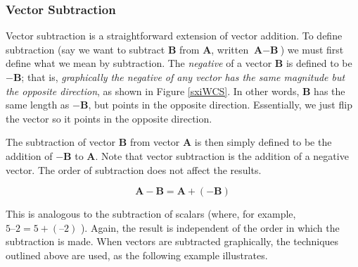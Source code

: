 \documentclass[../../main-ap-physics.tex]{subfiles}
\begin{document}
\endsolution

\subsubsection*{Vector Subtraction}

Vector subtraction is a straightforward extension of vector addition. To define subtraction (say we want to subtract \textbf{B} from  \textbf{A}, written $\textbf{A} - \textbf{B}$) we must first define what we mean by subtraction. The \textit{negative} of a vector \textbf{B} is defined to be $-\textbf{B}$; that is, \textit{graphically the negative of any vector has the same magnitude but the opposite direction}, as shown in Figure \ref{sxiWCS}. In other words,  \textbf{B} has the same length as $-\textbf{B}$, but points in the opposite direction. Essentially, we just flip the vector so it points in the opposite direction.

\begin{center}
    \captionsetup{type=figure,margin=1in,font=scriptsize}
    \label{sxiWCS}
\end{center}

The subtraction of vector \textbf{B} from vector \textbf{A} is then simply defined to be the addition of $-\textbf{B}$ to \textbf{A}. Note that vector subtraction is the addition of a negative vector. The order of subtraction does not affect the results.

\begin{equation}
    \textbf{A} - \textbf{B} = \textbf{A} + \left(-\textbf{B}\right)
\end{equation}

This is analogous to the subtraction of scalars (where, for example,  $5 – 2 = 5 + (–2)$ ). Again, the result is independent of the order in which the subtraction is made. When vectors are subtracted graphically, the techniques outlined above are used, as the following example illustrates.
\end{document}
